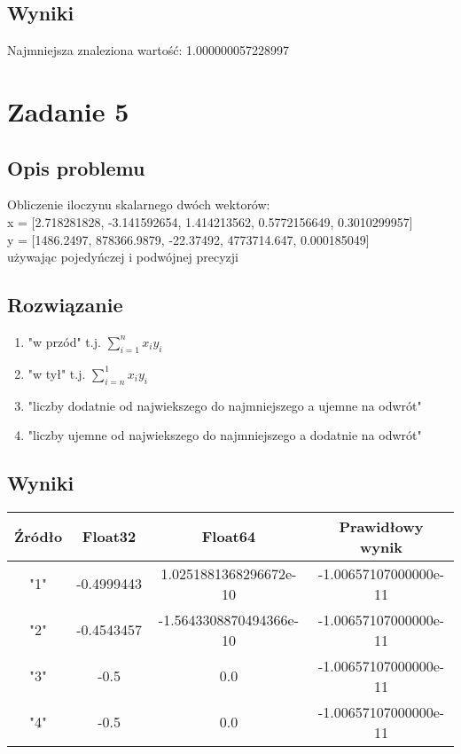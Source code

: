 \documentclass{article}
\begin{document}
\subsection{Wyniki}
	Najmniejsza znaleziona wartość:
	1.000000057228997

\section{Zadanie 5}
\subsection{Opis problemu}
    Obliczenie iloczynu skalarnego dwóch wektorów:\\
    x = [2.718281828, -3.141592654, 1.414213562, 0.5772156649, 0.3010299957]\\
    y = [1486.2497, 878366.9879, -22.37492, 4773714.647, 0.000185049]\\
    używając pojedyńczej i podwójnej precyzji
\subsection{Rozwiązanie}
    \begin{enumerate}
        \item "w przód" t.j. $\sum^n_{i=1} x_i y_i$
        \item "w tył" t.j. $\sum^1_{i=n} x_i y_i$
        \item "liczby dodatnie od najwiekszego do najmniejszego a ujemne na odwrót"
        \item "liczby ujemne od najwiekszego do najmniejszego a dodatnie na odwrót"
    \end{enumerate}
\subsection{Wyniki}
    \begin{center}
        \begin{tabular}{|c||c|c|c|}
        \hline
            Źródło & Float32 & Float64 & Prawidłowy wynik \\
            \hline\hline
            "1" & -0.4999443 & 1.0251881368296672e-10 & -1.00657107000000e-11\\
             \hline
             "2" & -0.4543457 & -1.5643308870494366e-10 & -1.00657107000000e-11\\
             \hline
             "3"& -0.5 & 0.0 & -1.00657107000000e-11\\
             \hline
             "4"& -0.5 & 0.0 & -1.00657107000000e-11\\
        \hline
        \end{tabular}
    \end{center}
\end{document}

